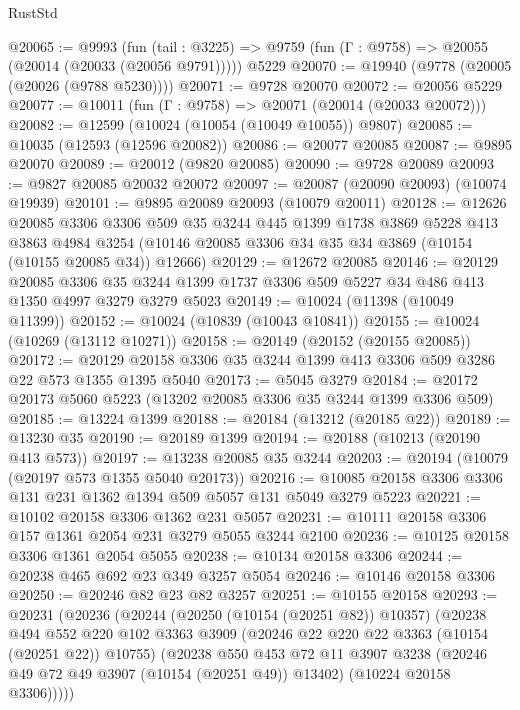 \begin{lexlean}{RustStd}
\begin{coremodule}
{\begin{coremodule}
{{{{{{{{{{{{{{{{{{{{{{{{{{@20065 := @9993
    (fun (tail : @3225) => @9759 (fun (Γ : @9758) => @20055 (@20014 (@20033 (@20056 @9791)))))
    @5229
@20070 := @19940 (@9778 (@20005 (@20026 (@9788 @5230))))
@20071 := @9728 @20070
@20072 := @20056 @5229
@20077 := @10011 (fun (Γ : @9758) => @20071 (@20014 (@20033 @20072)))
@20082 := @12599 (@10024 (@10054 (@10049 @10055)) @9807)
@20085 := @10035 (@12593 (@12596 @20082))
@20086 := @20077 @20085
@20087 := @9895 @20070
@20089 := @20012 (@9820 @20085)
@20090 := @9728 @20089
@20093 := @9827 @20085 @20032 @20072
@20097 := @20087 (@20090 @20093) (@10074 @19939)
@20101 := @9895 @20089 @20093 (@10079 @20011)
@20128 := @12626
    @20085
    @3306
    @3306
    @509
    @35
    @3244
    @445
    @1399
    @1738
    @3869
    @5228
    @413
    @3863
    @4984
    @3254
    (@10146 @20085 @3306 @34 @35 @34 @3869 (@10154 (@10155 @20085 @34)) @12666)
@20129 := @12672 @20085
@20146 := @20129
    @20085
    @3306
    @35
    @3244
    @1399
    @1737
    @3306
    @509
    @5227
    @34
    @486
    @413
    @1350
    @4997
    @3279
    @3279
    @5023
@20149 := @10024 (@11398 (@10049 @11399))
@20152 := @10024 (@10839 (@10043 @10841))
@20155 := @10024 (@10269 (@13112 @10271))
@20158 := @20149 (@20152 (@20155 @20085))
@20172 := @20129 @20158 @3306 @35 @3244 @1399 @413 @3306 @509 @3286 @22 @573 @1355 @1395 @5040
@20173 := @5045 @3279
@20184 := @20172 @20173 @5060 @5223 (@13202 @20085 @3306 @35 @3244 @1399 @3306 @509)
@20185 := @13224 @1399
@20188 := @20184 (@13212 (@20185 @22))
@20189 := @13230 @35
@20190 := @20189 @1399
@20194 := @20188 (@10213 (@20190 @413 @573))
@20197 := @13238 @20085 @35 @3244
@20203 := @20194 (@10079 (@20197 @573 @1355 @5040 @20173))
@20216 := @10085 @20158 @3306 @3306 @131 @231 @1362 @1394 @509 @5057 @131 @5049 @3279 @5223
@20221 := @10102 @20158 @3306 @1362 @231 @5057
@20231 := @10111 @20158 @3306 @157 @1361 @2054 @231 @3279 @5055 @3244 @2100
@20236 := @10125 @20158 @3306 @1361 @2054 @5055
@20238 := @10134 @20158 @3306
@20244 := @20238 @465 @692 @23 @349 @3257 @5054
@20246 := @10146 @20158 @3306
@20250 := @20246 @82 @23 @82 @3257
@20251 := @10155 @20158
@20293 := @20231
    (@20236
      (@20244
        (@20250 (@10154 (@20251 @82)) @10357)
        (@20238
          @494
          @552
          @220
          @102
          @3363
          @3909
          (@20246 @22 @220 @22 @3363 (@10154 (@20251 @22)) @10755)
          (@20238
            @550
            @453
            @72
            @11
            @3907
            @3238
            (@20246 @49 @72 @49 @3907 (@10154 (@20251 @49)) @13402)
            (@10224 @20158 @3306)))))
}}}}}}}}}}}}}}}}}}}}}}}}}}
\end{coremodule}}
\end{coremodule}
\end{lexlean}
